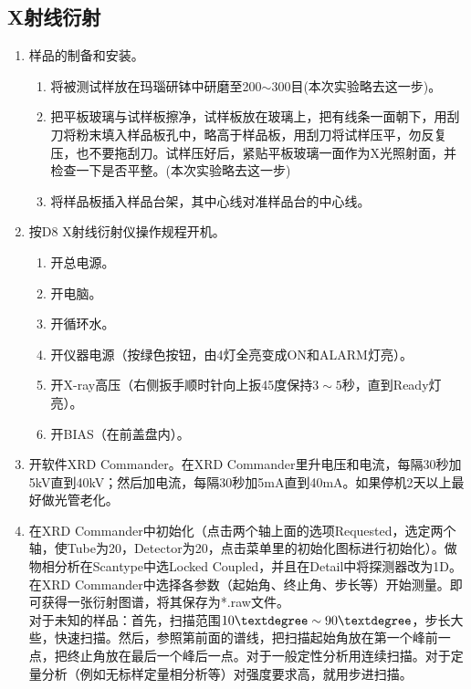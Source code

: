 \documentclass[a4paper]{article}
\begin{document}
\subsection{X射线衍射}
\begin{enumerate}
\item 样品的制备和安装。
\begin{enumerate}
\item 将被测试样放在玛瑙研钵中研磨至200$\sim$300目(本次实验略去这一步)。
\item 把平板玻璃与试样板擦净，试样板放在玻璃上，把有线条一面朝下，用刮刀将粉末填入样品板孔中，略高于样品板，用刮刀将试样压平，勿反复压，也不要拖刮刀。试样压好后，紧贴平板玻璃一面作为X光照射面，并检查一下是否平整。(本次实验略去这一步)
\item 将样品板插入样品台架，其中心线对准样品台的中心线。
\end{enumerate}
\item 按D8 X射线衍射仪操作规程开机。
\begin{enumerate}
	\item 开总电源。
    \item 开电脑。
	\item 开循环水。
	\item 开仪器电源（按绿色按钮，由4灯全亮变成ON和ALARM灯亮）。
	\item 开X-ray高压（右侧扳手顺时针向上扳45度保持$ 3\sim 5 $秒，直到Ready灯亮）。
	\item 开BIAS（在前盖盘内）。
\end{enumerate}
\item 开软件XRD Commander。在XRD Commander里升电压和电流，每隔30秒加5kV直到40kV；然后加电流，每隔30秒加5mA直到40mA。如果停机2天以上最好做光管老化。
\item 在XRD Commander中初始化（点击两个轴上面的选项Requested，选定两个轴，使Tube为20，Detector为20，点击菜单里的初始化图标进行初始化）。做物相分析在Scantype中选Locked Coupled，并且在Detail中将探测器改为1D。
在XRD Commander中选择各参数（起始角、终止角、步长等）开始测量。即可获得一张衍射图谱，将其保存为*.raw文件。\\
对于未知的样品：首先，扫描范围$ 10\textdegree\sim 90\textdegree $，步长大些，快速扫描。然后，参照第前面的谱线，把扫描起始角放在第一个峰前一点，把终止角放在最后一个峰后一点。对于一般定性分析用连续扫描。对于定量分析（例如无标样定量相分析等）对强度要求高，就用步进扫描。

\end{enumerate}
\end{document}
